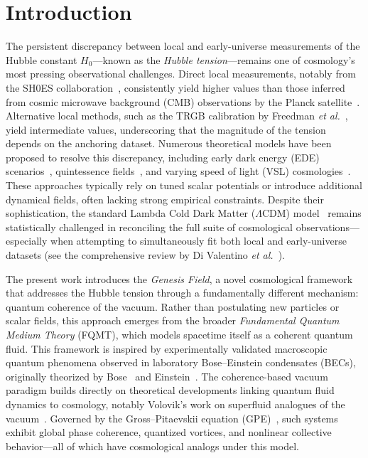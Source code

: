 \section{Introduction}
\label{sec:introduction}

The persistent discrepancy between local and early-universe measurements of the Hubble constant \( H_0 \)—known as the \textit{Hubble tension}—remains one of cosmology’s most pressing observational challenges. Direct local measurements, notably from the SH0ES collaboration~\cite{Riess2022}, consistently yield higher values than those inferred from cosmic microwave background (CMB) observations by the Planck satellite~\cite{Planck2020}. Alternative local methods, such as the TRGB calibration by Freedman \textit{et al.}~\cite{Freedman2021}, yield intermediate values, underscoring that the magnitude of the tension depends on the anchoring dataset. Numerous theoretical models have been proposed to resolve this discrepancy, including early dark energy (EDE) scenarios~\cite{divalentino2021realm}, quintessence fields~\cite{Caldwell1998}, and varying speed of light (VSL) cosmologies~\cite{Magueijo2003}. These approaches typically rely on tuned scalar potentials or introduce additional dynamical fields, often lacking strong empirical constraints. Despite their sophistication, the standard Lambda Cold Dark Matter (\(\Lambda\)CDM) model~\cite{Weinberg2013} remains statistically challenged in reconciling the full suite of cosmological observations—especially when attempting to simultaneously fit both local and early-universe datasets (see the comprehensive review by Di Valentino \textit{et al.}~\cite{divalentino2021realm}).

The present work introduces the \textit{Genesis Field}, a novel cosmological framework that addresses the Hubble tension through a fundamentally different mechanism: quantum coherence of the vacuum. Rather than postulating new particles or scalar fields, this approach emerges from the broader \textit{Fundamental Quantum Medium Theory} (FQMT), which models spacetime itself as a coherent quantum fluid. This framework is inspired by experimentally validated macroscopic quantum phenomena observed in laboratory Bose–Einstein condensates (BECs), originally theorized by Bose~\cite{Bose1924} and Einstein~\cite{Einstein1925}. The coherence-based vacuum paradigm builds directly on theoretical developments linking quantum fluid dynamics to cosmology, notably Volovik's work on superfluid analogues of the vacuum~\cite{volovik2003universe}. Governed by the Gross–Pitaevskii equation (GPE)~\cite{Gross1961,Pitaevskii1961}, such systems exhibit global phase coherence, quantized vortices, and nonlinear collective behavior—all of which have cosmological analogs under this model.

